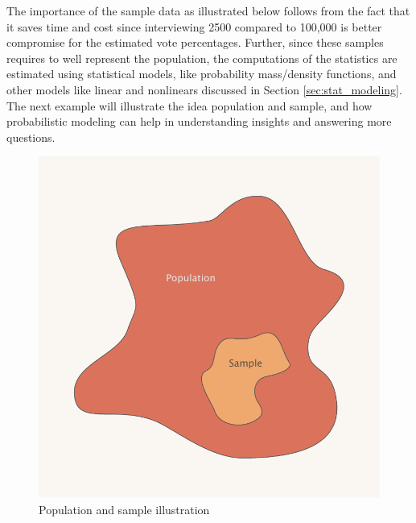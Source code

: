 The importance of the sample data as illustrated below follows from the fact that it saves time and cost since interviewing 2500 compared to 100,000 is better compromise for the estimated vote percentages. Further, since these samples requires to well represent the population, the computations of the statistics are estimated using statistical models, like probability mass/density functions, and other models like linear and nonlinears discussed in Section \ref{sec:stat_modeling}. The next example will illustrate the idea population and sample, and how probabilistic modeling can help in understanding insights and answering more questions.
\begin{figure}[t]
    \includegraphics[width=\textwidth]{img/pop_sample.pdf}
    \caption{Population and sample illustration}
    \label{fig:pop_sample}
\end{figure}
